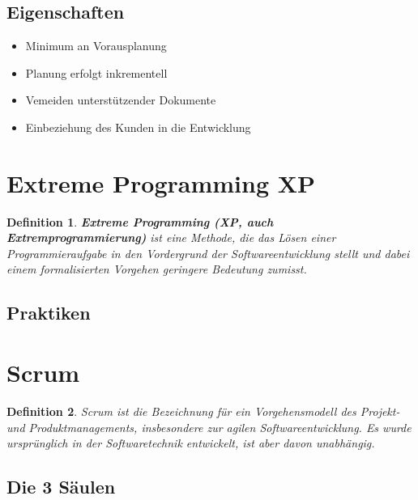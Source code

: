 \documentclass[a4paper]{article}
\theoremstyle{break}
\newtheorem{defi}{Definition}[section]
\begin{document}
        \subsection{Eigenschaften}
        \begin{itemize}
            \item Minimum an Vorausplanung
            \item Planung erfolgt inkrementell
            \item Vemeiden unterstützender Dokumente
            \item Einbeziehung des Kunden in die Entwicklung
        \end{itemize}
        
          
    \section{Extreme Programming XP}
    \begin{defi}
      \textbf{Extreme Programming (XP, auch Extremprogrammierung)} ist eine Methode, die das Lösen einer Programmieraufgabe in den Vordergrund der Softwareentwicklung stellt und dabei einem formalisierten Vorgehen geringere Bedeutung zumisst.
    \end{defi}

    \subsection{Praktiken}
    
    \section{Scrum}
    \begin{defi}
      Scrum ist die Bezeichnung für ein Vorgehensmodell des Projekt- und Produktmanagements, insbesondere zur agilen Softwareentwicklung. Es wurde ursprünglich in der Softwaretechnik entwickelt, ist aber davon unabhängig.
    \end{defi}

    \subsection{Die 3 Säulen}
    
    
\end{document}
